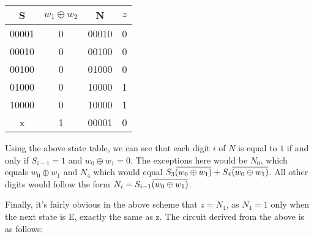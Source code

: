 \documentclass[12pt]{article}
\newcommand{\overbar}[1]
    {\mkern1.5mu\overline{\mkern-1.5mu#1\mkern-1.5mu}\mkern1.5mu}
\begin{document}
\begin{enumerate}
\begin{enumerate}
\begin{center}
\begin{minipage}{0.4\textwidth}
\begin{center}
\begin{tikzpicture}[scale=1.25]
          \end{tikzpicture}
        \end{center}
      \end{minipage}
      \hfill
      \begin{minipage}{0.4\textwidth}
        \begin{center}
          \begin{tabular}{c|c||c|c}
            S & $w_1 \oplus w_2$ & N & $z$ \\
            \hline
            \hline
            00001 & 0 & 00010 & 0 \\
            00010 & 0 & 00100 & 0 \\
            00100 & 0 & 01000 & 0 \\
            01000 & 0 & 10000 & 1 \\
            10000 & 0 & 10000 & 1 \\
            x & 1 & 00001 & 0 \\
          \end{tabular}
        \end{center}
      \end{minipage}
    \end{center}

    Using the above state table, we can see that each digit $i$ of $N$ is equal to $1$ if and only if $S_{i-1} = 1$ and $w_0 \oplus w_1 = 0$. The exceptions here would be $N_0$, which equals $w_0 \oplus w_1$ and $N_4$ which would equal $S_3\overbar{(w_0 \oplus w_1)} + S_4\overbar{(w_0 \oplus w_1)}$. All other digits would follow the form $N_i = S_{i-1}\overbar{(w_0 \oplus w_1)}$.


    Finally, it's fairly obvious in the above scheme that $z=N_4$, as $N_4 = 1$ only when the next state is E, exactly the same as z. The circuit derived from the above is as follows:

    \begin{center}
\end{center}
\end{enumerate}
\end{enumerate}
\end{document}

